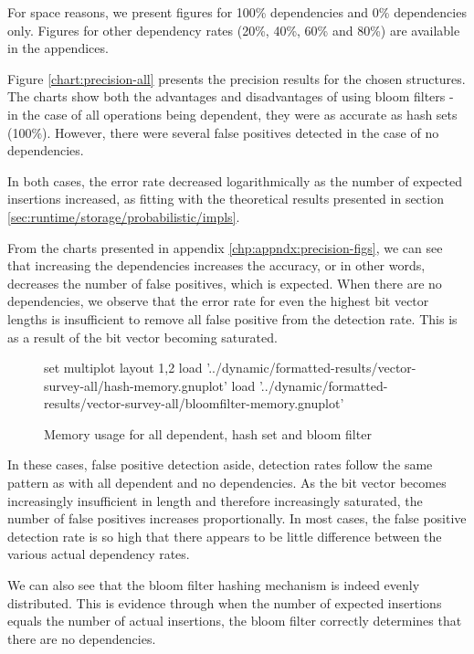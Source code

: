 For space reasons, we present figures for 100\% dependencies and 0\% dependencies only. Figures for other dependency rates (20\%, 40\%, 60\% and 80\%) are available in the appendices.

Figure \ref{chart:precision-all} presents the precision results for the chosen structures. The charts show both the advantages and disadvantages of using bloom filters - in the case of all operations being dependent, they were as accurate as hash sets (100\%). However, there were several false positives detected in the case of no dependencies.

In both cases, the error rate decreased logarithmically as the number of expected insertions increased, as fitting with the theoretical results presented in section \ref{sec:runtime/storage/probabilistic/impls}.

From the charts presented in appendix \ref{chp:appndx:precision-figs}, we can see that increasing the dependencies increases the accuracy, or in other words, decreases the number of false positives, which is expected. When there are no dependencies, we observe that the error rate for even the highest bit vector lengths is insufficient to remove all false positive from the detection rate. This is as a result of the bit vector becoming saturated.

\begin{figure}
	\centering
	\begin{gnuplot}[terminal=pdf]
		set multiplot layout 1,2
			load '../dynamic/formatted-results/vector-survey-all/hash-memory.gnuplot'
			load '../dynamic/formatted-results/vector-survey-all/bloomfilter-memory.gnuplot'
	\end{gnuplot}
	\caption{Memory usage for all dependent, hash set and bloom filter}
	\label{chart:mem-hashbloom-all}
\end{figure}

In these cases, false positive detection aside, detection rates follow the same pattern as with all dependent and no dependencies. As the bit vector becomes increasingly insufficient in length and therefore increasingly saturated, the number of false positives increases proportionally. In most cases, the false positive detection rate is so high that there appears to be little difference between the various actual dependency rates.

We can also see that the bloom filter hashing mechanism is indeed evenly distributed. This is evidence through when the number of expected insertions equals the number of actual insertions, the bloom filter correctly determines that there are no dependencies.

